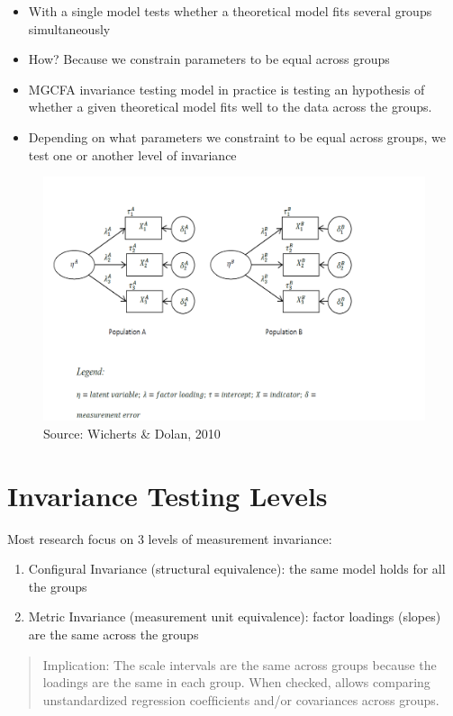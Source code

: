 \documentclass[
]{book}
\begin{document}
\begin{itemize}
\item
  With a single model tests whether a theoretical model fits several groups simultaneously
\item
  How? Because we constrain parameters to be equal across groups
\item
  MGCFA invariance testing model in practice is testing an hypothesis of whether a given theoretical model fits well to the data across the groups.
\item
  Depending on what parameters we constraint to be equal across groups, we test one or another level of invariance
\end{itemize}

\begin{figure}
\includegraphics[width=0.8\linewidth]{multi_group} \caption{Source: Wicherts & Dolan, 2010}\label{fig:mgcfa}
\end{figure}

\hypertarget{invariance-testing-levels}{%
\section{Invariance Testing Levels}\label{invariance-testing-levels}}

Most research focus on 3 levels of measurement invariance:

\begin{enumerate}
\def\labelenumi{\arabic{enumi}.}
\item
  Configural Invariance (structural equivalence): the same model holds for all the groups
\item
  Metric Invariance (measurement unit equivalence): factor loadings (slopes) are the same across the groups
\end{enumerate}

\begin{quote}
Implication: The scale intervals are the same across groups because the loadings are the same in each group. When checked, allows comparing unstandardized regression coefﬁcients and/or covariances across groups.
\end{quote}
\end{document}
